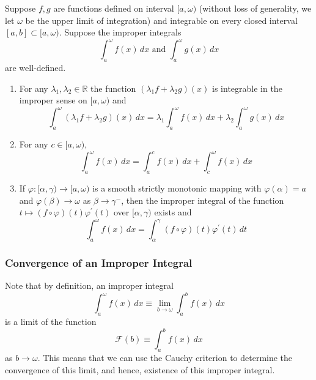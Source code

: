     \begin{lemma}
      Suppose $f, g$ are functions defined on interval $[a, \omega)$ (without loss of generality, we let $\omega$ be the upper limit of integration) and integrable on every closed interval $[a, b] \subset [a, \omega)$. Suppose the improper integrals 
      \[\int_a^\omega f(x)\,dx \text{ and } \int_a^\omega g(x)\,dx\]
      are well-defined. 
      \begin{enumerate}
        \item For any $\lambda_1, \lambda_2 \in \mathbb{R}$ the function $(\lambda_1 f + \lambda_2 g)(x)$ is integrable in the improper sense on $[a, \omega)$ and
        \[\int_a^\omega (\lambda_1 f + \lambda_2 g)(x)\,dx = \lambda_1 \int_a^\omega f(x)\,dx + \lambda_2 \int_a^\omega g(x)\,dx\]
        \item For any $c \in [a, \omega)$, 
        \[\int_a^\omega f(x)\,dx = \int_a^c f(x)\,dx + \int_c^\omega f(x)\,dx\]
        \item If $\varphi: [\alpha, \gamma) \longrightarrow [a, \omega)$ is a smooth strictly monotonic mapping with $\varphi(\alpha) = a$ and $\varphi(\beta) \rightarrow \omega$ as $\beta \rightarrow \gamma^-$, then the improper integral of the function $t \mapsto (f \circ \varphi)(t) \varphi^\prime (t)$ over $[\alpha, \gamma)$ exists and 
        \[\int_a^\omega f(x)\,dx = \int_\alpha^\gamma (f \circ \varphi)(t) \varphi^\prime (t)\,dt\]
      \end{enumerate}
    \end{lemma}

    \subsubsection{Convergence of an Improper Integral}

      Note that by definition, an improper integral 
      \[\int_a^\omega f(x)\,dx \equiv \lim_{b \rightarrow \omega} \int_a^b f(x) \,dx\]
      is a limit of the function 
      \[\mathcal{F}(b) \equiv \int_a^b f(x)\,dx\]
      as $b \rightarrow \omega$. This means that we can use the Cauchy criterion to determine the convergence of this limit, and hence, existence of this improper integral. 

